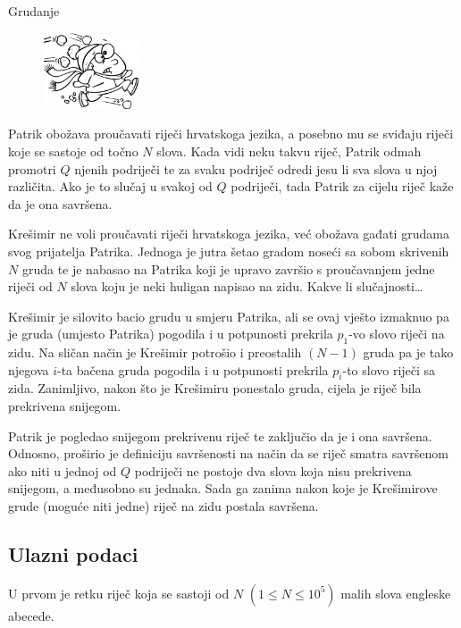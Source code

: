 \begin{statement}[
  problempoints=70,
  timelimit=1 sekunda,
  memorylimit=512 MiB,
]{Grudanje}

\setlength\intextsep{-0.1cm}
\begin{figure}
\centering
\includegraphics[width=0.25\textwidth]{img/gruda.png}
\end{figure}

Patrik obožava proučavati riječi hrvatskoga jezika, a posebno mu se sviđaju
riječi koje se sastoje od točno $N$ slova. Kada vidi neku takvu riječ, Patrik
odmah promotri $Q$ njenih podriječi te za svaku podriječ odredi jesu li sva
slova u njoj različita. Ako je to slučaj u svakoj od $Q$ podriječi, tada Patrik
za cijelu riječ kaže da je ona savršena.

Krešimir ne voli proučavati riječi hrvatskoga jezika, već obožava gađati
grudama svog prijatelja Patrika. Jednoga je jutra šetao gradom noseći sa
sobom skrivenih $N$ gruda te je nabasao na Patrika koji je upravo završio s
proučavanjem jedne riječi od $N$ slova koju je neki huligan napisao na zidu.
Kakve li slučajnosti\dots

Krešimir je silovito bacio grudu u smjeru Patrika, ali se ovaj vješto
izmaknuo pa je gruda (umjesto Patrika) pogodila i u potpunosti prekrila $p_1$-vo
slovo riječi na zidu. Na sličan način je Krešimir potrošio i preostalih $(N-1)$
gruda pa je tako njegova $i$-ta bačena gruda pogodila i u potpunosti prekrila
$p_i$-to slovo riječi sa zida. Zanimljivo, nakon što je Krešimiru ponestalo
gruda, cijela je riječ bila prekrivena snijegom.

Patrik je pogledao snijegom prekrivenu riječ te zaključio da je i ona savršena.
Odnosno, proširio je definiciju savršenosti na način da se riječ smatra
savršenom ako niti u jednoj od $Q$ podriječi ne postoje dva slova koja nisu
prekrivena snijegom, a međusobno su jednaka. Sada ga zanima nakon koje je
Krešimirove grude (moguće niti jedne) riječ na zidu postala savršena.

\subsection*{Ulazni podaci}
U prvom je retku riječ koja se sastoji od $N$ $(1 \le N \le 10^5)$ malih slova
engleske abecede.


\end{statement}
